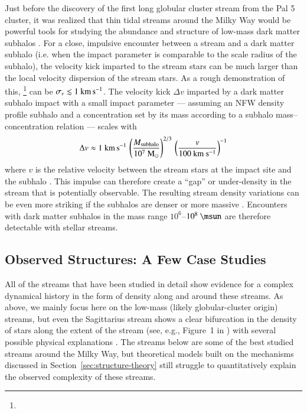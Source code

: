 \documentclass[final,5p,times,twocolumn,authoryear]{elsarticle}
\begin{document}
Just before the discovery of the first long globular cluster stream from the Pal 5
cluster, it was realized that thin tidal streams around the Milky Way would be powerful
tools for studying the abundance and structure of low-mass dark matter subhalos
\citep{ibata:2002,johnston:2002}.
For a close, impulsive encounter between a stream and a dark matter subhalo (i.e. when
the impact parameter is comparable to the scale radius of the subhalo), the velocity
kick imparted to the stream stars can be much larger than the local velocity dispersion
of the stream stars.
As a rough demonstration of this, \footnote{} can be $\sigma_v \lesssim 1~\kms$.
The velocity kick $\Delta v$ imparted by a dark matter subhalo impact with a small
impact parameter --- assuming an NFW density profile subhalo and a concentration set by
its mass according to a subhalo mass--concentration relation \citep{moline:2017} ---
scales with
\begin{equation}
    \Delta v \approx 1~\kms \,
        \left(\frac{M_{\rm subhalo}}{10^7~{\rm M}_\odot}\right)^{2/3}\,
        \left(\frac{v}{100~{\rm km}~{\rm s}^{-1}}\right)^{-1}
\end{equation}
where $v$ is the relative velocity between the stream stars at the impact site and the
subhalo \citep[see also][]{erkal:2015a, sanders:2016}.
This impulse can therefore create a ``gap'' or under-density in the stream that is
potentially observable.
The resulting stream density variations can be even more striking if the subhalos are
denser or more massive \citep[see, e.g.,][]{yoon:2011, bonaca:2014}.
Encounters with dark matter subhalos in the mass range $10^6$--$10^8~\unit{\msun}$ are
therefore detectable with stellar streams.


\subsection{Observed Structures: A Few Case Studies}
\label{sec:structure-obs}

All of the streams that have been studied in detail show evidence for a complex
dynamical history in the form of density  along and around these streams.
As above, we mainly focus here on the low-mass (likely globular-cluster origin)
streams, but even the Sagittarius stream shows a clear bifurcation in the density of
stars along the extent of the stream (see, e.g., Figure~1 in \citealt{belokurov:2006})
with several possible physical explanations \citep[e.g.,][]{penarrubia:2010,
vasiliev:2020, vasiliev:2021}.
The streams below are some of the best studied streams around the Milky Way, but
theoretical models built on the mechanisms discussed in
Section~\ref{sec:structure-theory} still struggle to quantitatively explain the observed
complexity of these streams.
\end{document}
